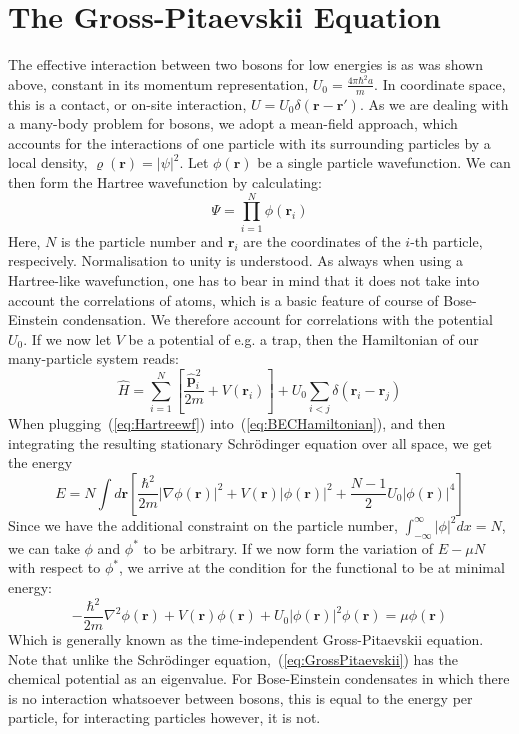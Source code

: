 \section{The Gross-Pitaevskii Equation}
The effective interaction between two bosons for low energies is as was shown above, constant in its momentum representation, $U_0=\frac{4\pi\hbar^2a}{m}$. 
In coordinate space, this is a contact, or on-site interaction, $U=U_0\delta(\mathbf{r}-\mathbf{r'})$. As we are dealing with a many-body problem for bosons, we adopt a 
mean-field approach, which accounts for the interactions of one particle with its surrounding particles by a local density, $\varrho(\mathbf{r})=|\psi|^2$. 
Let $\phi(\mathbf{r})$ be a single particle wavefunction. We can then form the Hartree wavefunction by calculating:
\begin{equation}\label{eq:Hartreewf}
	\Psi=\prod_{i=1}^{N}\phi(\mathbf{r}_i)
\end{equation}
Here, $N$ is the particle number and $\mathbf{r}_i$ are the coordinates of the $i$-th particle, respecively. Normalisation to unity is understood. As always when using a Hartree-like wavefunction, one has to bear in mind that it does not take into account the correlations of atoms, which is a basic feature of course of Bose-Einstein condensation. We therefore account for correlations with the potential $U_0$. If we now let $V$ be a potential of e.g. a trap, then the Hamiltonian of our many-particle system reads:
\begin{equation}\label{eq:BECHamiltonian}
	\hat{H}=\sum_{i=1}^{N}\left[\frac{\hat{\mathbf{p}}_i^2}{2m}+V(\mathbf{r}_i)\right]+U_0\sum_{i<j}
\delta(\mathbf{r}_i-\mathbf{r}_j)
\end{equation}
When plugging~(\ref{eq:Hartreewf}) into~(\ref{eq:BECHamiltonian}), and then integrating the resulting stationary Schr\"odinger equation over all space, we get the energy
\begin{equation}\label{eq:energfunct}
	E=N\int d\mathbf{r}\left[\frac{\hbar^2}{2m}|\nabla \phi(\mathbf{r})|^2 + V(\mathbf{r})|\phi(\mathbf{r})|^2 + \frac{N-1}{2}U_0|\phi(\mathbf{r})|^4\right]
\end{equation}
Since we have the additional constraint on the particle number, $\int_{-\infty}^{\infty}|\phi|^2dx=N$,  we can take $\phi$ and $\phi^*$ to be arbitrary. If we now form the variation of $E-\mu N$ with respect 
to $\phi^*$, we arrive at the condition for the functional to be at minimal energy:
\begin{equation}\label{eq:GrossPitaevskii}
-\frac{\hbar^2}{2m}\nabla^2\phi(\mathbf{r})+V(\mathbf{r})\phi(\mathbf{r})+U_0|\phi(\mathbf{r})|^2\phi(\mathbf{r})=\mu\phi(\mathbf{r})
\end{equation}
Which is generally known as the time-independent Gross-Pitaevskii equation. Note that unlike the Schr\"odinger equation,~(\ref{eq:GrossPitaevskii}) has the chemical potential as an eigenvalue. For Bose-Einstein condensates in which there is no interaction whatsoever between bosons, this is equal to the energy per particle, for interacting particles however, it is not. 

